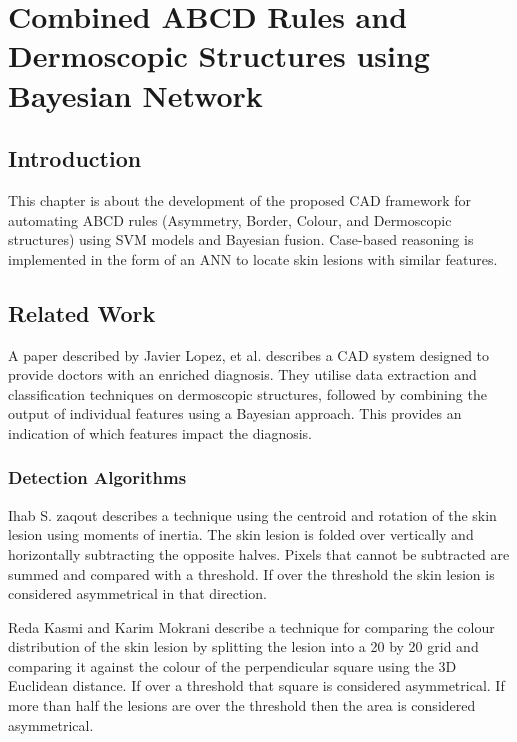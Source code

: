 \chapter{Combined ABCD Rules and Dermoscopic Structures using Bayesian Network}

\section{Introduction}
This chapter is about the development of the proposed CAD framework for automating ABCD rules (Asymmetry, Border, Colour, and Dermoscopic structures) using SVM models and Bayesian fusion. Case-based reasoning is implemented in the form of an ANN to locate skin lesions with similar features.

\section{Related Work}
A paper described by Javier Lopez, et al.\cite{Lopez-Labraca2018} describes a CAD system designed to provide doctors with an enriched diagnosis. They utilise data extraction and classification techniques on dermoscopic structures, followed by combining the output of individual features using a Bayesian approach. This provides an indication of which features impact the diagnosis.

\subsection{Detection Algorithms}
Ihab S. zaqout\cite{Zaqout2016} describes a technique using the centroid and rotation of the skin lesion using moments of inertia. The skin lesion is folded over vertically and horizontally subtracting the opposite halves. Pixels that cannot be subtracted are summed and compared with a threshold. If over the threshold the skin lesion is considered asymmetrical in that direction.

Reda Kasmi and Karim Mokrani\cite{Kasmi2016} describe a technique for comparing the colour distribution of the skin lesion by splitting the lesion into a 20 by 20 grid and comparing it against the colour of the perpendicular square using the 3D Euclidean distance. If over a threshold that square is considered asymmetrical. If more than half the lesions are over the threshold then the area is considered asymmetrical.

